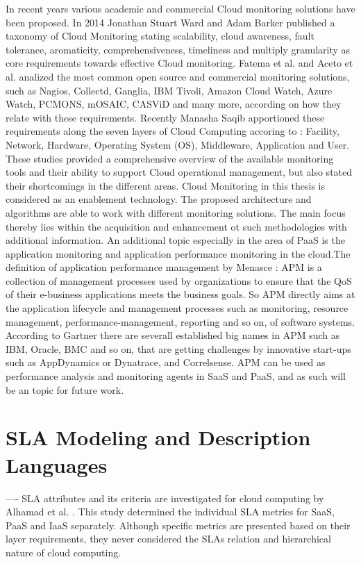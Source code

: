 In recent years various academic and commercial Cloud monitoring solutions have been proposed. In 2014 Jonathan Stuart Ward and Adam Barker \cite{ward2014observing} published a taxonomy of Cloud Monitoring stating scalability, cloud awareness, fault tolerance, aromaticity, comprehensiveness, timeliness and multiply granularity as core requirements towards effective Cloud monitoring. Fatema et al. \cite{fatema2014survey} and Aceto et al. \cite{aceto2013cloud} analized the most common open source and commercial monitoring solutions, such as Nagios, Collectd, Ganglia, IBM Tivoli, Amazon Cloud Watch, Azure Watch, PCMONS, mOSAIC, CASViD and many more, according on how they relate with these requirements. Recently Manasha Saqib \cite{saqib2017cloud} apportioned these requirements along the seven layers of Cloud Computing accoring to \cite{CSA3.0} \cite{spring2011monitoring1} \cite{spring2011monitoring2}: Facility, Network, Hardware, Operating System (OS), Middleware, Application and User. These studies provided a comprehensive overview of the available monitoring tools and their ability to support Cloud operational management, but also stated their shortcomings in the different areas. Cloud Monitoring in this thesis is considered as an enablement technology. The proposed architecture and algorithms are able to work with different monitoring solutions. The main focus thereby lies within the acquisition and enhancement ot such methodologies with additional information.
An additional topic especially in the area of PaaS is the application monitoring and application performance monitoring in the cloud.The definition of application performance management by Menasce \cite{menasce2002load}: APM is a collection of management processes used by organizations to ensure that the QoS of their e-business applications meets the business goals. So APM directly aims at the application lifecycle and management processes such as monitoring, resource management, performance-management, reporting and so on, of software systems. According to Gartner \cite{GartnerAPM} there are severall established big names in APM such as IBM, Oracle, BMC and so on, that are getting challenges by innovative start-ups such as AppDynamics or Dynatrace, and Correlsense. APM can be used as performance analysis and monitoring agents in SaaS and PaaS, and as such will be an topic for future work.


\section{SLA Modeling and Description Languages}
----
SLA attributes and its criteria are investigated for cloud computing by Alhamad et al. \cite{5610586}. This study determined the individual SLA metrics for SaaS, PaaS and IaaS separately. Although specific metrics are presented based on their layer requirements, they never considered the SLAs relation and hierarchical nature of cloud computing. 

